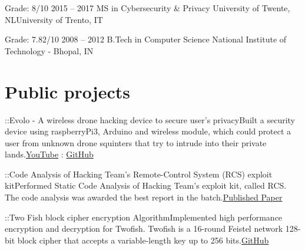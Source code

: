 \documentclass{tccv}
\begin{document}
\begin{yearlist}

\item[Grade: 8/10]{2015 -- 2017}
     {MS in Cybersecurity \& Privacy}
     {University of Twente, NL\newline University of Trento, IT}
     
\item[Grade: 7.82/10]{2008 -- 2012}
     {B.Tech in Computer Science}
     {National Institute of Technology - Bhopal, IN}

\end{yearlist}

\section{Public projects}
\begin{yearlist}
\item{::}{Evolo - A wireless drone hacking device to secure user’s privacy}{Built a security device using raspberryPi3, Arduino and wireless module, which could protect a user from unknown drone squinters that try to intrude into their private lands.\newline\href{https://www.youtube.com/watch?v=1HGsP9x9wTU}{YouTube} : \href{https://github.com/amitgupta46/Evolo}{GitHub}}

\item{::}{Code Analysis of Hacking Team’s Remote-Control System (RCS) exploit kit}{Performed Static Code Analysis of Hacking Team’s exploit kit, called RCS. The code analysis was awarded the best report in the batch.\newline\href{http://securitylab.disi.unitn.it/lib/exe/fetch.php?media=teaching\%3Aofftech\%3A2015\%3Areports\%3Acodeanalysis_hackingteam.pdf}{Published Paper}}
     
\item{::}{Two Fish block cipher encryption Algorithm}{Implemented high performance encryption and decryption for Twofish. Twofish is a 16-round Feistel network 128-bit block cipher that accepts a variable-length key up to 256 bits.\newline\href{https://github.com/amitgupta46/Magma}{GitHub}}

\end{yearlist}
\end{document}
